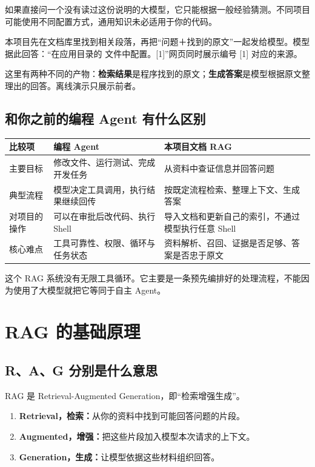 \documentclass[UTF8,11pt,a4paper,fontset=fandol]{ctexart}
\newcommand{\code}[1]{\texttt{\detokenize{#1}}}
\begin{document}
如果直接问一个没有读过这份说明的大模型，它只能根据一般经验猜测。不同项目可能使用不同配置方式，通用知识未必适用于你的代码。

本项目先在文档库里找到相关段落，再把“问题＋找到的原文”一起发给模型。模型据此回答：“在应用目录的 \code{.env} 文件中配置。[1]”网页同时展示编号 [1] 对应的来源。

这里有两种不同的产物：\textbf{检索结果}是程序找到的原文；\textbf{生成答案}是模型根据原文整理出的回答。离线演示只展示前者。

\subsection{和你之前的编程 Agent 有什么区别}
\begin{longtable}{L{0.22\textwidth}L{0.32\textwidth}L{0.34\textwidth}}
\toprule
比较项 & 编程 Agent & 本项目文档 RAG \\
\midrule
主要目标 & 修改文件、运行测试、完成开发任务 & 从资料中查证信息并回答问题 \\
典型流程 & 模型决定工具调用，执行结果继续回传 & 按既定流程检索、整理上下文、生成答案 \\
对项目的操作 & 可以在审批后改代码、执行 Shell & 导入文档和更新自己的索引，不通过模型执行任意 Shell \\
核心难点 & 工具可靠性、权限、循环与任务状态 & 资料解析、召回、证据是否足够、答案是否忠于原文 \\
\bottomrule
\end{longtable}
这个 RAG 系统没有无限工具循环。它主要是一条预先编排好的处理流程，不能因为使用了大模型就把它等同于自主 Agent。

\section{RAG 的基础原理}

\subsection{R、A、G 分别是什么意思}
RAG 是 Retrieval-Augmented Generation，即“检索增强生成”。
\begin{enumerate}
\item \textbf{Retrieval，检索：}从你的资料中找到可能回答问题的片段。
\item \textbf{Augmented，增强：}把这些片段加入模型本次请求的上下文。
\item \textbf{Generation，生成：}让模型依据这些材料组织回答。
\end{enumerate}
\end{document}
